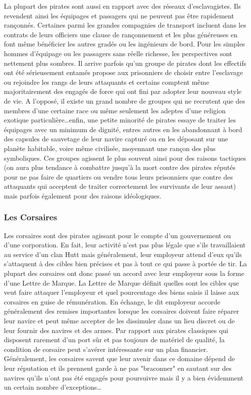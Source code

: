 \documentclass[twoside]{article}
\begin{document}
La plupart des pirates sont aussi en rapport avec des réseaux d'esclavagistes. Ils revendent ainsi les équipages et passagers qui ne peuvent pas être rapidement rançonnés. Certaines parmi les grandes compagnies de transport incluent dans les contrats de leurs officiers une clause de rançonnement et les plus généreuses en font même bénéficier les autres gradés ou les ingénieurs de bord. Pour les simples hommes d'équipage ou les passagers sans réelle richesse, les perspectives sont nettement plus sombres. Il arrive parfois qu'un groupe de pirates dont les effectifs ont été sérieusement entamés propose aux prisonniers de choisir entre l'esclavage ou rejoindre les rangs de leurs attaquants et certains comptent même majoritairement des engagés de force qui ont fini par adopter leur nouveau style de vie. A l'opposé, il existe un grand nombre de groupes qui ne recrutent que des membres d'une certaine race ou même seulement les adeptes d'une religion exotique particulière\ldots enfin, une petite minorité de pirates essaye de traiter les équipages avec un minimum de dignité, entres autres en les abandonnant à bord des capsules de sauvetage de leur navire capturé ou en les déposant sur une planète habitable, voire même civilisée, moyennant une rançon des plus symboliques. Ces groupes agissent le plus souvent ainsi pour des raisons tactiques (on aura plus tendance à combattre jusqu'à la mort contre des pirates réputés pour ne pas faire de quartiers ou vendre tous leurs prisonniers que contre des attaquants qui acceptent de traiter correctement les survivants de leur assaut) mais parfois également pour des raisons idéologiques.

\subsubsection{Les Corsaires}
Les corsaires sont des pirates agissant pour le compte d'un gouvernement ou d'une corporation. En fait, leur activité n'est pas plus légale que s'ils travaillaient au service d'un clan Hutt mais généralement, leur employeur attend d'eux qu'ils s'attaquent à des cibles bien précises et pas à tout ce qui passe à portée de tir. La plupart des corsaires ont donc passé un accord avec leur employeur sous la forme d'une Lettre de Marque. La Lettre de Marque définit quelles sont les cibles que veut faire attaquer l'employeur et quel pourcentage des biens saisis il laisse aux corsaires en guise de rémunération. En échange, le dit employeur accorde généralement des remises importantes lorsque les corsaires doivent faire réparer leur navire et peut même accepter de les dissimuler dans un lieu discret ou de leur fournir des navires et des armes. Par rapport aux pirates classiques qui disposent rarement d'un port sûr et pas toujours de matériel de qualité, la condition de corsaire peut s'avérer intéressante sur un plan financier. Généralement, les corsaires savent que leur avenir dans ce domaine dépend de leur réputation et ils prennent garde à ne pas "braconner" en sautant sur des navires qu'ils n'ont pas été engagés pour poursuivre mais il y a bien évidemment un certain nombre d'exceptions\ldots\\
\end{document}
